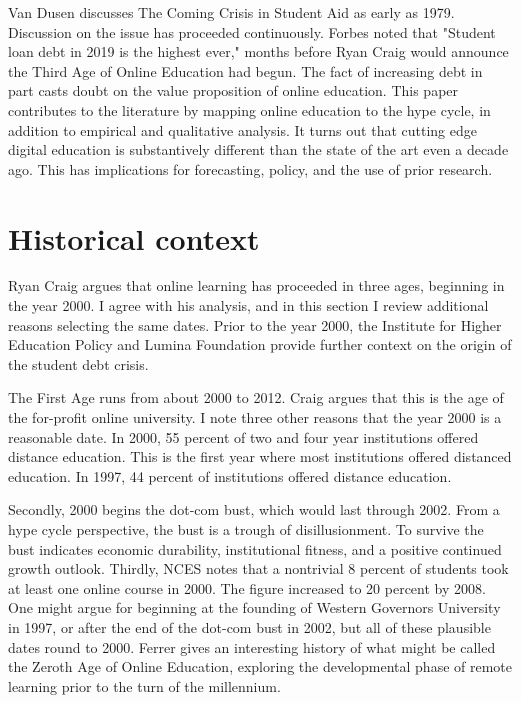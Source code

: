 \documentclass[review]{elsarticle}
\begin{document}
Van Dusen discusses The Coming Crisis in Student Aid as early as 1979\cite{van1979coming}.
Discussion on the issue has proceeded continuously.
Forbes\cite{friedman2019student} noted that "Student loan debt in 2019 is the highest ever,"
months before Ryan Craig would announce the Third Age of Online Education had begun\cite{craig2019welcome}.
The fact of increasing debt in part casts doubt on the value proposition of online education.
This paper contributes to the literature by mapping online education to the hype cycle, in addition to empirical and qualitative analysis.
It turns out that cutting edge digital education is substantively different than the state of the art even a decade ago.
This has implications for forecasting, policy, and the use of prior research.

\section{Historical context}

Ryan Craig argues that online learning has proceeded in three ages, beginning in the year 2000.
I agree with his analysis,
and in this section I review additional reasons selecting the same dates.
Prior to the year 2000,
the Institute for Higher Education Policy and Lumina Foundation provide further context
on the origin of the student debt crisis\cite{foundation_2017}.

The First Age runs from about 2000 to 2012.
Craig argues that this is the age of the for-profit online university.
I note three other reasons that the year 2000 is a reasonable date.
In 2000, 55 percent of two and four year institutions offered distance education\cite{tabs2003distance}.
This is the first year where most institutions offered distanced education.
In 1997, 44 percent of institutions offered distance education\cite{sikora2002profile}.

Secondly, 2000 begins the dot-com bust, which would last through 2002\cite{wollscheid2012rise}.
From a hype cycle perspective, the bust is a trough of disillusionment.
To survive the bust indicates economic durability, institutional fitness, and a positive continued growth outlook.
Thirdly, NCES notes that a nontrivial 8 percent of students took at least one online course in 2000\cite{radford2011learning}.
The figure increased to 20 percent by 2008.
One might argue for beginning at the founding of Western Governors University in 1997, or after the end of the dot-com bust in 2002, but all of these plausible dates round to 2000.
Ferrer gives an interesting history of what might be called the Zeroth Age of Online Education, exploring the developmental phase of remote learning prior to the turn of the millennium\cite{ferrer_2019}.
\end{document}
